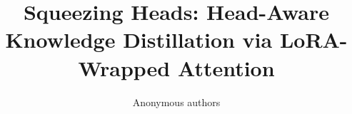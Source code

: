 \title{\textbf{Squeezing Heads: Head-Aware Knowledge Distillation via LoRA-Wrapped Attention}}

\author{Anonymous authors}
